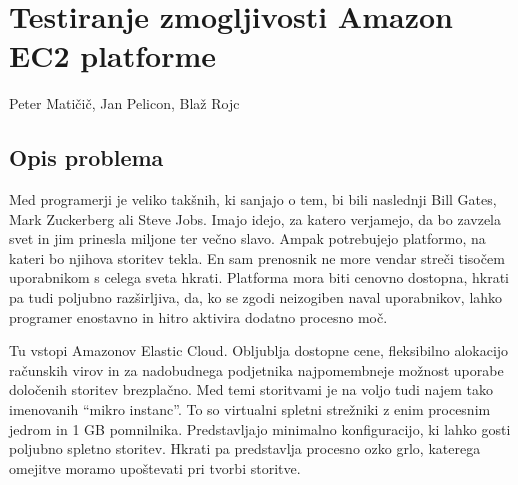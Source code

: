 \chapter[Testiranje zmogljivosti Amazon EC2 platforme (P. Matičič, J. Pelicon, B. Rojc)]{Testiranje zmogljivosti Amazon EC2 platforme}

\pagestyle{fancy}
\fancyhf{}
\fancyhead[LE,RO]{\thepage}
\fancyhead[RE,LO]{\leftmark}

\huge Peter Matičič, Jan Pelicon, Blaž Rojc
\normalsize
\bigskip

\section{Opis problema}

%

Med programerji je veliko takšnih, ki sanjajo o tem, bi bili naslednji Bill Gates, Mark Zuckerberg ali Steve Jobs.
Imajo idejo, za katero verjamejo, da bo zavzela svet in jim prinesla miljone ter večno slavo.
Ampak potrebujejo platformo, na kateri bo njihova storitev tekla.
En sam prenosnik ne more vendar streči tisočem uporabnikom s celega sveta hkrati.
Platforma mora biti cenovno dostopna, hkrati pa tudi poljubno razširljiva, da, ko se zgodi neizogiben naval uporabnikov, lahko programer enostavno in hitro aktivira dodatno procesno moč.

Tu vstopi Amazonov Elastic Cloud. %
Obljublja dostopne cene, fleksibilno alokacijo računskih virov in za nadobudnega podjetnika najpomembneje možnost uporabe določenih storitev brezplačno.
Med temi storitvami je na voljo tudi najem tako imenovanih ``mikro instanc''. %
To so virtualni spletni strežniki z enim procesnim jedrom in 1 GB pomnilnika.
Predstavljajo minimalno konfiguracijo, ki lahko gosti poljubno spletno storitev.
Hkrati pa predstavlja procesno ozko grlo, katerega omejitve moramo upoštevati pri tvorbi storitve.

